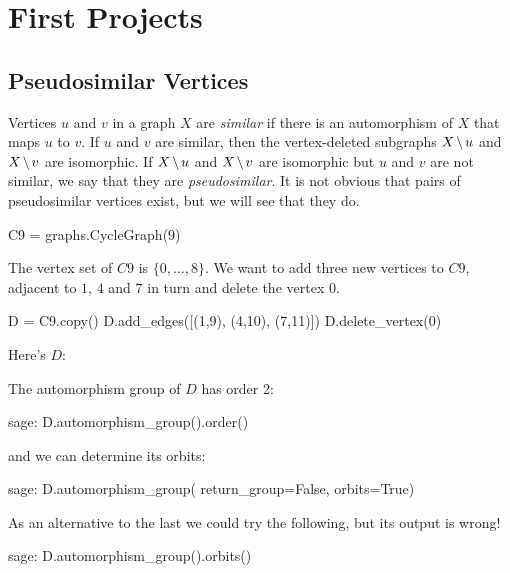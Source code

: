 
\chapter{First Projects}

\section{Pseudosimilar Vertices}

Vertices $u$ and $v$ in a graph $X$ are \textsl{similar} if there is an automorphism
of $X$ that maps $u$ to $v$. If $u$ and $v$ are similar, then the vertex-deleted
subgraphs $X\mathbin{\mkern-1.5mu\setminus\mkern-1.5mu} u$ and $X\mathbin{\mkern-1.5mu\setminus\mkern-1.5mu} v$ are isomorphic. If $X\mathbin{\mkern-1.5mu\setminus\mkern-1.5mu} u$ and $X\mathbin{\mkern-1.5mu\setminus\mkern-1.5mu} v$ 
are isomorphic but $u$ and $v$ are not similar, we say that they are
\textsl{pseudosimilar}. It is not obvious that pairs of pseudosimilar vertices
exist, but we will see that they do.

\begin{sageblock}
    C9 = graphs.CycleGraph(9)
\end{sageblock}
The vertex set of $C9$ is $\{0,\ldots,8\}$. We want to add three new vertices
to $C9$, adjacent to $1$, $4$ and $7$ in turn and delete the vertex $0$.
\begin{sageblock}
    D = C9.copy()
    D.add_edges([(1,9), (4,10), (7,11)])
    D.delete_vertex(0)
\end{sageblock}
Here's $D$:
\begin{center}
\end{center}

The automorphism group of $D$ has order 2:
\begin{sageexample}
    sage: D.automorphism_group().order()
\end{sageexample}
and we can determine its orbits:
\begin{sageexample}
    sage: D.automorphism_group( return_group=False, orbits=True)
\end{sageexample}

As an alternative to the last we could try the following, but its
output is wrong!
\begin{sageexample}
    sage: D.automorphism_group().orbits()
\end{sageexample}

